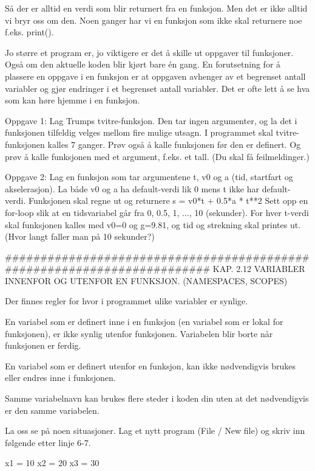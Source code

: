 {Så der er alltid en verdi som blir returnert fra en funksjon.
Men det er ikke alltid vi bryr oss om den.
Noen ganger har vi en funksjon som ikke skal returnere noe f.eks. print(). 



Jo større et program er, jo viktigere er det å skille ut oppgaver til funksjoner.
Også om den aktuelle koden blir kjørt bare én gang. 
En forutsetning for å plassere en oppgave i en funksjon 
er at oppgaven avhenger av et begrenset antall variabler 
og gjør endringer i et begrenset antall variabler. 
Det er ofte lett å se hva som kan høre hjemme i en funksjon. 



Oppgave 1: Lag Trumps tvitre-funksjon. Den tar ingen argumenter, 
og la det i funksjonen tilfeldig velges mellom fire mulige utsagn. 
I programmet skal tvitre-funksjonen kalles 7 ganger. 
Prøv også å kalle funksjonen før den er definert. 
Og prøv å kalle funksjonen med et argument, f.eks. et tall. 
(Du skal få feilmeldinger.) 


Oppgave 2: Lag en funksjon som tar argumentene t, v0 og a 
(tid, startfart og akselerasjon).
La både v0 og a ha default-verdi lik 0 mens t ikke har default-verdi. 
Funksjonen skal regne ut og returnere  s = v0*t + 0.5*a * t**2
Sett opp en for-loop slik at en tidsvariabel går fra 0, 0.5, 1, ..., 10 (sekunder).
For hver t-verdi skal funksjonen kalles med v0=0 og g=9.81, 
og tid og strekning skal printes ut.
(Hvor langt faller man på 10 sekunder?) 

######################################################################## 
KAP. 2.12  VARIABLER INNENFOR OG UTENFOR EN FUNKSJON. 
(NAMESPACES, SCOPES)

Der finnes regler for hvor i programmet ulike variabler er synlige. 

En variabel som er definert inne i en funksjon (en variabel som er 
lokal for funksjonen), er ikke synlig utenfor funksjonen. 
Variabelen blir borte når funksjonen er ferdig. 

En variabel som er definert utenfor en funksjon, kan ikke nødvendigvis 
brukes eller endres inne i funksjonen. 

Samme variabelnavn kan brukes flere steder i koden din uten at det 
nødvendigvis er den samme variabelen.


La oss se på noen situasjoner. 
Lag et nytt program (File / New file) og skriv inn følgende etter linje 6-7.

x1 = 10
x2 = 20
x3 = 30

}
